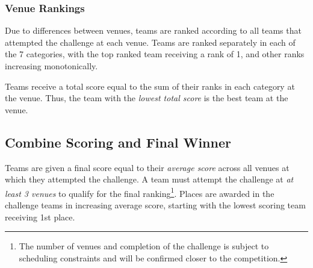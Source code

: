\subsubsection{Venue Rankings}
Due to differences between venues, teams are ranked according to all teams that attempted the challenge at each venue. Teams are ranked separately in each of the 7 categories, with the top ranked team receiving a rank of 1, and other ranks increasing monotonically.

Teams receive a total score equal to the sum of their ranks in each category at the venue. 
Thus, the team with the \textit{lowest total score} is the best team at the venue.

\subsection{Combine Scoring and Final Winner}
Teams are given a final score equal to their \textit{average score} across all venues at which they attempted the challenge. A team must attempt the challenge at \textit{at least 3 venues} to qualify for the final ranking\footnote{The number of venues and completion of the challenge is subject to scheduling constraints and will be confirmed closer to the competition.}.
Places are awarded in the challenge teams in increasing average score, starting with the lowest scoring team receiving 1st place.

